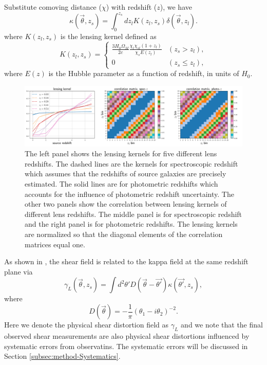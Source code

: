 \documentclass[twocolumn]{aastex62}
\begin{document}
Substitute comoving distance ($\chi$) with redshift ($z$), we have
\begin{equation}\label{eq-delta2kappa}
\kappa(\vec{\theta},z_s)=\int_0^{z_s} dz_l K(z_l,z_s)\delta(\vec{\theta},z_l).
\end{equation}
where $K(z_l,z_s)$ is the lensing kernel defined as
\begin{equation}
K(z_l,z_s) =
\begin{cases}
\frac{3H_0\Omega_M}{2 c} \frac{\chi_l \chi_{sl} (1+z_l)}{\chi_{s} E\left(z_l\right)} & (z_s>z_l),\\
0&(z_s \leq z_l),
\end{cases}
\end{equation}
where $E(z)$ is the Hubble parameter as a function of redshift, in units of $H_0$.

\begin{figure}[!t]
 \centering
 \includegraphics[width=1.\textwidth]{lensing_kernel.pdf}
 \caption{The left panel shows the lensing kernels for five different lens redshifts. The dashed lines are the
        kernels for spectroscopic redshift which assumes that the redshifts of source galaxies are precisely
        estimated. The solid lines are for photometric redshifts which accounts for the influence of photometric
        redshift uncertainty. The other two panels show the correlation between lensing kernels of different
        lens redshifts. The middle panel is for spectroscopic redshift and the right panel is for photometric
        redshifts. The lensing kernels are normalized so that the diagonal elements of the correlation matrices
        equal one.}\label{fig-corlensKer}
\end{figure}

As shown in \citet{massMap-KS1993}, the shear field is related to the kappa field at the same redshift plane
via
\begin{equation}\label{eq-kappa2gamma}
\gamma_L(\vec{\theta},z_s) = \int  d^2 \theta' D(\vec{\theta}-\vec{\theta'}) \kappa(\vec{\theta'},z_s),
\end{equation}
where
\begin{equation}
D(\vec{\theta})=-\frac{1}{\pi}(\theta_1-i\theta_2)^{-2}.
\end{equation}
Here we denote the physical shear distortion field as $\gamma_L$ and we note that the final observed shear measurements
are also physical shear distortions influenced by systematic errors from observatins. The systematic errors will be discussed
in Section \ref{subsec:method-Systematics}.
\end{document}
